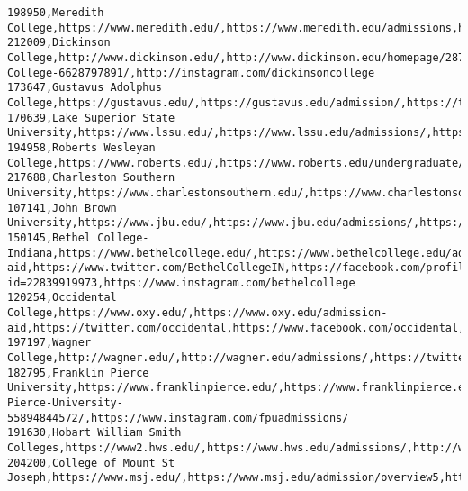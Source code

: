 \documentclass[11pt]{article}
\begin{document}
\begin{Verbatim}[commandchars=\\\{\}]
198950,Meredith College,https://www.meredith.edu/,https://www.meredith.edu/admissions,https://twitter.com/meredithcollege,https://www.facebook.com/MeredithCollege,http://instagram.com/meredithcollege/
212009,Dickinson College,http://www.dickinson.edu/,http://www.dickinson.edu/homepage/287/admissions,http://twitter.com/DickinsonCol,https://www.facebook.com/Dickinson-College-6628797891/,http://instagram.com/dickinsoncollege
173647,Gustavus Adolphus College,https://gustavus.edu/,https://gustavus.edu/admission/,https://twitter.com/gustavus,https://www.facebook.com/gustavusadolphuscollege,https://instagram.com/gustavusadolphuscollege
170639,Lake Superior State University,https://www.lssu.edu/,https://www.lssu.edu/admissions/,https://twitter.com/lifeatlssu,http://www.facebook.com/lakestate,https://www.instagram.com/lakestateu/
194958,Roberts Wesleyan College,https://www.roberts.edu/,https://www.roberts.edu/undergraduate/admissions.aspx,http://twitter.com/RobertsWesleyan,http://www.facebook.com/RobertsWesleyanCollege,http://instagram.com/RobertsWesleyan
217688,Charleston Southern University,https://www.charlestonsouthern.edu/,https://www.charlestonsouthern.edu/admissions/,http://www.twitter.com/csuniv,http://www.facebook.com/charlestonsouthernuniversity,http://instagram.com/charlestonsouthern
107141,John Brown University,https://www.jbu.edu/,https://www.jbu.edu/admissions/,https://twitter.com/johnbrownuniv,https://www.facebook.com/JohnBrownUniversity/,https://www.instagram.com/johnbrownuniversity/
150145,Bethel College-Indiana,https://www.bethelcollege.edu/,https://www.bethelcollege.edu/admission-aid,https://www.twitter.com/BethelCollegeIN,https://facebook.com/profile.php?id=22839919973,https://www.instagram.com/bethelcollege
120254,Occidental College,https://www.oxy.edu/,https://www.oxy.edu/admission-aid,https://twitter.com/occidental,https://www.facebook.com/occidental,https://www.instagram.com/occidentalcollege/
197197,Wagner College,http://wagner.edu/,http://wagner.edu/admissions/,https://twitter.com/wagnercollege,https://facebook.com/wagnercollege,https://instagram.com/wagnercollege
182795,Franklin Pierce University,https://www.franklinpierce.edu/,https://www.franklinpierce.edu/admissions/,https://twitter.com/FPUniversity,https://www.facebook.com/Franklin-Pierce-University-55894844572/,https://www.instagram.com/fpuadmissions/
191630,Hobart William Smith Colleges,https://www2.hws.edu/,https://www.hws.edu/admissions/,http://www.twitter.com/hwscolleges,http://www.facebook.com/hwscolleges,http://instagram.com/hwscolleges
204200,College of Mount St Joseph,https://www.msj.edu/,https://www.msj.edu/admission/overview5,https://twitter.com/MountStJosephU/,https://www.facebook.com/MountStJosephU/,https://www.instagram.com/MountStJosephU/

\end{Verbatim}
\end{document}
